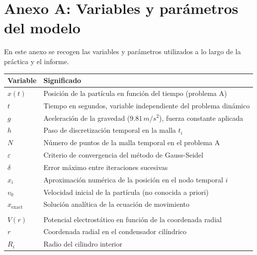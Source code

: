 \documentclass[12pt]{article}
\begin{document}
\newpage
\appendix
\section*{Anexo A: Variables y parámetros del modelo}

En este anexo se recogen las variables y parámetros utilizados a lo largo de la práctica y el informe.

\begin{center}
\begin{tabular}{ll}
\hline
\textbf{Variable} & \textbf{Significado} \\
\hline

$x(t)$ & Posición de la partícula en función del tiempo (problema A) \\

$t$ & Tiempo en segundos, variable independiente del problema dinámico \\

$g$ & Aceleración de la gravedad ($9.81\,m/s^2$), fuerza constante aplicada \\

$h$ & Paso de discretización temporal en la malla $t_i$ \\

$N$ & Número de puntos de la malla temporal en el problema A \\

$\varepsilon$ & Criterio de convergencia del método de Gauss-Seidel \\

$\delta$ & Error máximo entre iteraciones sucesivas \\

$x_i$ & Aproximación numérica de la posición en el nodo temporal $i$ \\

$v_0$ & Velocidad inicial de la partícula (no conocida a priori) \\

$x_{\text{exact}}$ & Solución analítica de la ecuación de movimiento \\

\\
\hline
$V(r)$ & Potencial electrostático en función de la coordenada radial \\

$r$ & Coordenada radial en el condensador cilíndrico \\

$R_i$ & Radio del cilindro interior \\


\end{tabular}
\end{center}
\end{document}
